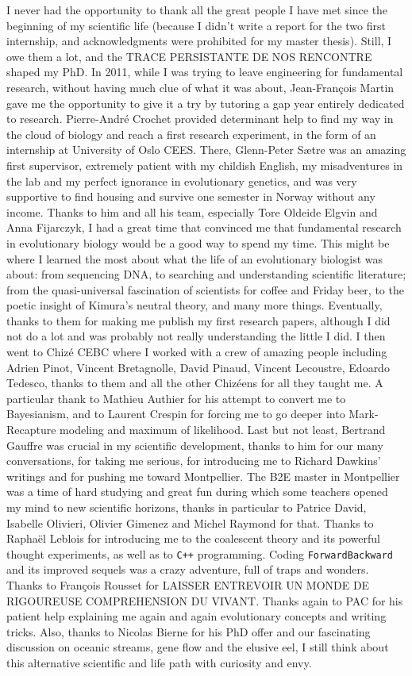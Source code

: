 I never had the opportunity to thank all the great people I have met since the beginning of my scientific life (because I didn't write a report for the two first internship, and acknowledgments were prohibited for my master thesis). Still, I owe them a lot, and the TRACE PERSISTANTE DE NOS RENCONTRE shaped my PhD. 
In 2011, while I was trying to leave engineering for fundamental research, without having much clue of what it was about, Jean-Fran\c{c}ois Martin gave me the opportunity to give it a try by tutoring a gap year entirely dedicated to research. Pierre-Andr\'{e} Crochet provided determinant help to find my way in the cloud of biology and reach a first research experiment, in the form of an internship at University of Oslo CEES. There, Glenn-Peter S{\ae}tre was an amazing first supervisor, extremely patient with my childish English, my misadventures in the lab and my perfect ignorance in evolutionary genetics, and was very supportive to find housing and survive one semester in Norway without any income. Thanks to him and all his team, especially Tore Oldeide Elgvin and Anna Fijarczyk, I had a great time that convinced me that fundamental research in evolutionary biology would be a good way to spend my time. This might be where I learned the most about what the life of an evolutionary biologist was about: from sequencing DNA, to searching and understanding scientific literature; from the quasi-universal fascination of scientists for coffee and Friday beer, to the poetic insight of Kimura's neutral theory, and many more things. Eventually, thanks to them for making me publish my first research papers, although I did not do a lot and was probably not really understanding the little I did. 
I then went to Chiz\'{e} CEBC where I worked with a crew of amazing people including Adrien Pinot, Vincent Bretagnolle, David Pinaud, Vincent Lecoustre, Edoardo Tedesco, thanks to them and all the other Chiz\'eens for all they taught me. A particular thank to Mathieu Authier for his attempt to convert me to Bayesianism, and to Laurent Crespin for forcing me to go deeper into Mark-Recapture modeling and maximum of likelihood. Last but not least, Bertrand Gauffre was crucial in my scientific development, thanks to him for our many conversations, for taking me serious, for introducing me to Richard Dawkins' writings and for pushing me toward Montpellier. 
The B2E master in Montpellier was a time of hard studying and great fun during which some teachers opened my mind to new scientific horizons, thanks in particular to Patrice David, Isabelle Olivieri, Olivier Gimenez and Michel Raymond for that.
Thanks to Rapha\"{e}l Leblois for introducing me to the coalescent theory and its powerful thought experiments, as well as to \texttt{C++} programming. Coding \texttt{ForwardBackward} and its improved sequels was a crazy adventure, full of traps and wonders. Thanks to Fran\c{c}ois Rousset for LAISSER ENTREVOIR UN MONDE DE RIGOUREUSE COMPREHENSION DU VIVANT.
Thanks again to PAC for his patient help explaining me again and again evolutionary concepts and writing tricks.
Also, thanks to Nicolas Bierne for his PhD offer and our fascinating discussion on oceanic streams, gene flow and the elusive eel, I still think about this alternative scientific and life path with curiosity and envy. 

